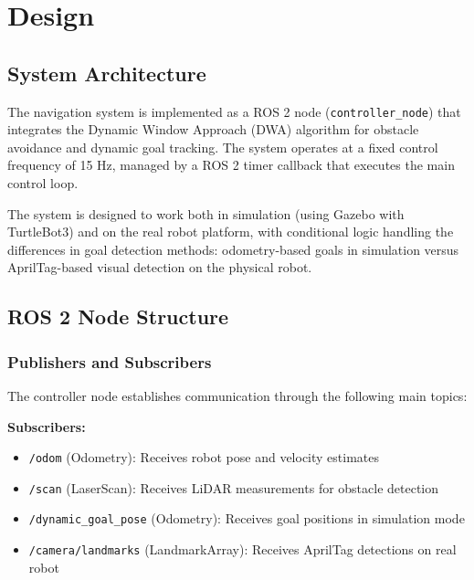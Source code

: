 
\section{Design}
\label{sec:design}

\subsection{System Architecture}
The navigation system is implemented as a ROS 2 node (\texttt{controller\_node}) that integrates the Dynamic Window Approach (DWA) algorithm for obstacle avoidance and dynamic goal tracking. The system operates at a fixed control frequency of 15 Hz, managed by a ROS 2 timer callback that executes the main control loop.

The system is designed to work both in simulation (using Gazebo with TurtleBot3) and on the real robot platform, with conditional logic handling the differences in goal detection methods: odometry-based goals in simulation versus AprilTag-based visual detection on the physical robot.

\subsection{ROS 2 Node Structure}

\subsubsection{Publishers and Subscribers}
The controller node establishes communication through the following main topics:

\textbf{Subscribers:}
\begin{itemize}
    \item \texttt{/odom} (Odometry): Receives robot pose and velocity estimates
    \item \texttt{/scan} (LaserScan): Receives LiDAR measurements for obstacle detection
    \item \texttt{/dynamic\_goal\_pose} (Odometry): Receives goal positions in simulation mode
    \item \texttt{/camera/landmarks} (LandmarkArray): Receives AprilTag detections on real robot
\end{itemize}

